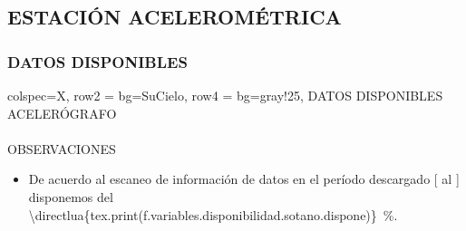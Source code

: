 \subsection{ESTACIÓN ACELEROMÉTRICA \MakeUppercase{}}
\subsubsection{DATOS DISPONIBLES}
\begin{longtblr}{
        colspec={X},
        row{2} = {bg=SuCielo},
        row{4} = {bg=gray!25},
    }
    DATOS DISPONIBLES \\
    ACELERÓGRAFO \MakeUppercase{} \\
     \\
    OBSERVACIONES \\
    \begin{itemize}
        \item De acuerdo al escaneo de información de datos en el período descargado [ al ] disponemos del \qty{\directlua{tex.print(f.variables.disponibilidad.sotano.dispone)}}{\percent}.
    \end{itemize}
\end{longtblr}
